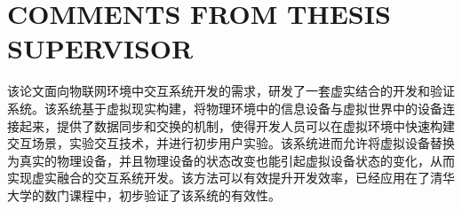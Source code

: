
\chapter{COMMENTS FROM THESIS SUPERVISOR}

该论文面向物联网环境中交互系统开发的需求，研发了一套虚实结合的开发和验证系统。该系统基于虚拟现实构建，将物理环境中的信息设备与虚拟世界中的设备连接起来，提供了数据同步和交换的机制，使得开发人员可以在虚拟环境中快速构建交互场景，实验交互技术，并进行初步用户实验。该系统进而允许将虚拟设备替换为真实的物理设备，并且物理设备的状态改变也能引起虚拟设备状态的变化，从而实现虚实融合的交互系统开发。该方法可以有效提升开发效率，已经应用在了清华大学的数门课程中，初步验证了该系统的有效性。